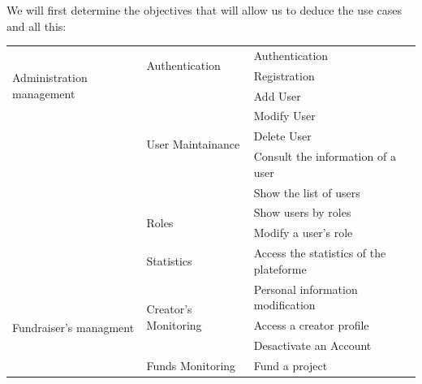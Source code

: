 We will first determine the objectives that will allow us to deduce the use cases and all this:
\begin{longtable}{|m{10em}|m{10em}|m{10em}|}\hline
    \multirow{4}{*}{Administration management} & \multirow{2}{*}{Authentication}       & Authentication                          \\\cline{3-3}
                                               &                                       & Registration                            \\\cline{2-3}
                                               & \multirow{5}{*}{User Maintainance}    & Add User                                \\\cline{3-3}
                                               &                                       & Modify User                             \\\cline{3-3}
                                               &                                       & Delete User                             \\\cline{3-3}
                                               &                                       & Consult the information of a user       \\\cline{3-3}
                                               &                                       & Show the list of users                  \\\cline{2-3}
                                               & \multirow{2}{*}{Roles}                & Show users by roles                     \\\cline{3-3}
                                               &                                       & Modify a user's role                    \\\cline{2-3}
                                               & \multirow{1}{*}{Statistics}           & Access the statistics of the plateforme \\\hline
    \multirow{4}{*}{Fundraiser's managment}    & \multirow{3}{*}{Creator's Monitoring} & Personal information modification       \\\cline{3-3}
                                               &                                       & Access a creator profile                \\\cline{3-3}
                                               &                                       & Desactivate an Account                  \\\cline{2-3}
                                               & \multirow{2}{*}{Funds Monitoring}     & Fund a project                          \\\cline{3-3}

\end{longtable}
